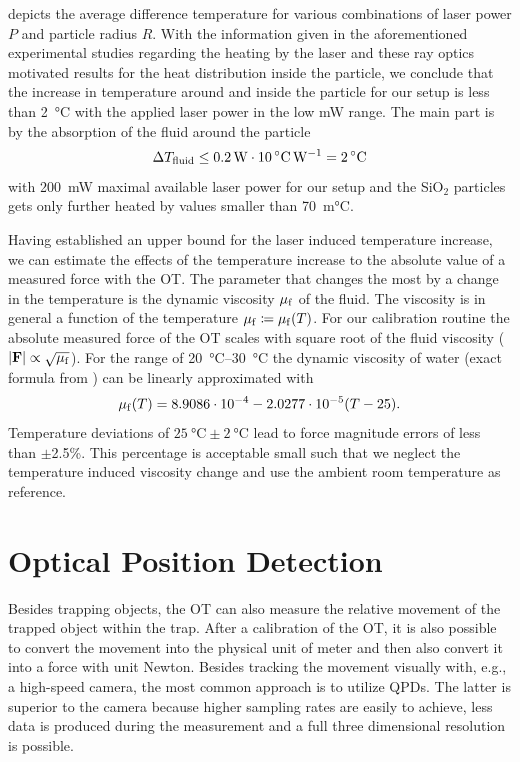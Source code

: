  depicts the average difference temperature for various 
combinations of laser power $P$ and particle radius $R$. With the information 
given in the aforementioned experimental studies regarding the heating by the 
laser and these ray optics motivated results for the heat distribution inside 
the particle, we conclude that the increase in temperature around and inside 
the particle for our setup is less than \SI{2}{\degreeCelsius} with the applied 
laser power in the low \si{\milli\watt} range. The main part is by the 
absorption of the fluid around the particle \begin{equation}
  \Delta T_{\mathrm{fluid}}
  \leq
  \SI{0.2}{\watt}\cdot\SI{10}{\celsius\per\watt}
  =
  \SI{2}{\celsius}
\end{equation}
with \SI{200}{\milli\watt} maximal available laser power for our setup and the 
SiO$_{2}$ particles gets only further heated by values smaller than 
\SI{70}{\milli\celsius}.

Having established an upper bound for the laser induced temperature increase, 
we can estimate the effects of the temperature increase to the absolute value 
of a measured force with the OT. The parameter that changes the most by a 
change in the temperature is the dynamic viscosity $\mu_{\mathrm{f}}$ of the fluid. The 
viscosity is in general a function of the temperature $\mu_{\mathrm{f}}\coloneqq\mu_{\mathrm{f}}(T)$. 
For our calibration routine the absolute measured force of the OT scales with 
square root of the fluid viscosity ($\abs{\vb{F}}\propto\sqrt{\mu_{\mathrm{f}}}$). 
For the range of \SIrange{20}{30}{\degreeCelsius} the dynamic viscosity of 
water (exact formula from \cite{Peterman2003}) can be linearly approximated 
with
\begin{equation}
  \mu_{\mathrm{f}}(T) = 8.9086\cdot 10^{-4} -2.0277\cdot10^{-5} (T-25).
  \label{eq:TO-viscosity}
\end{equation}
Temperature deviations of $\SI{25}{\degreeCelsius}\pm\SI{2}{\degreeCelsius}$ 
lead to force magnitude errors of less than $\pm$2.5\%. This percentage is 
acceptable small such that we neglect the temperature induced viscosity change 
and use the ambient room temperature as reference.

\section{Optical Position Detection\label{sec:TO-QPD}}

Besides trapping objects, the OT can also measure the relative movement of the 
trapped object within the trap. After a calibration of the OT, it is also 
possible to convert the movement into the physical unit of meter and then also 
convert it into a force with unit Newton. Besides tracking the movement 
visually with, e.g., a high-speed camera, the most common approach is to 
utilize QPDs. The latter is superior to the camera because higher sampling 
rates are easily to achieve, less data is produced during the measurement and a 
full three dimensional resolution is possible.

